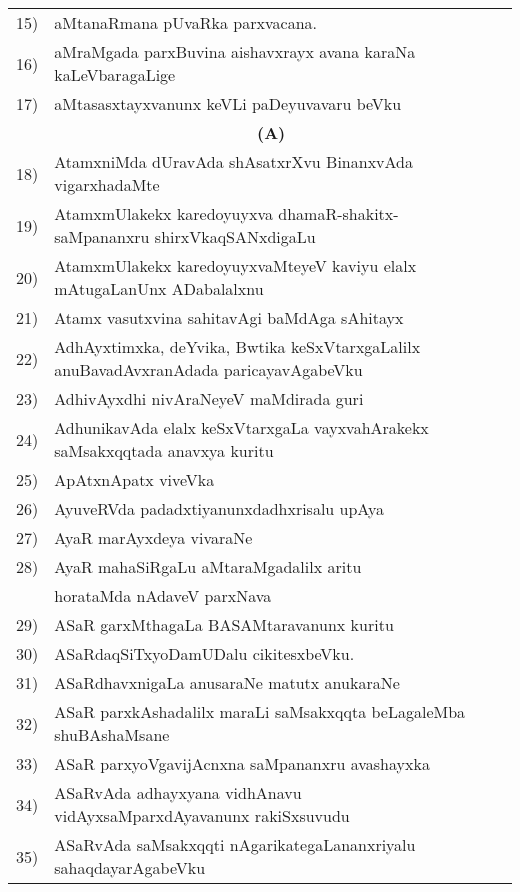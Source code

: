 {\begin{longtable}{@{}cp{7.4cm}r}
15) & aMtanaRmana pUvaRka parxvacana. & \pageref{page83}\\
16) & aMraMgada parxBuvina aishavxrayx avana karaNa kaLeVbaragaLige  & \pageref{page190}\\
17) & aMtasasxtayxvanunx keVLi paDeyuvavaru beVku & \pageref{page108}\\ 
    &   \multicolumn{1}{c}{\textbf{(A)}} & \\    
18) & AtamxniMda dUravAda shAsatxrXvu BinanxvAda vigarxhadaMte &   \pageref{page188}\\
19) & AtamxmUlakekx karedoyuyxva dhamaR-shakitx-saMpananxru shirxVkaqSANxdigaLu &   \pageref{page237}\\
20) & AtamxmUlakekx karedoyuyxvaMteyeV kaviyu elalx mAtugaLanUnx ADabalalxnu &   \pageref{page237}\\
21) & Atamx vasutxvina sahitavAgi baMdAga sAhitayx & \pageref{page196}\\
22) & AdhAyxtimxka, deYvika, Bwtika keSxVtarxgaLalilx anuBavadAvxranAdada paricayavAgabeVku & \pageref{page127}\\
23) & AdhivAyxdhi nivAraNeyeV maMdirada guri & \pageref{page67}\\
24) & AdhunikavAda elalx keSxVtarxgaLa vayxvahArakekx saMsakxqqtada anavxya kuritu & \pageref{page36}\\
25) & ApAtxnApatx viveVka & \pageref{page173}\\
26) & AyuveRVda padadxtiyanunxdadhxrisalu upAya & \pageref{page50}\\
27) & AyaR marAyxdeya vivaraNe & \pageref{page90}\\
28) & AyaR mahaSiRgaLu aMtaraMgadalilx aritu &   \\
    & horataMda nAdaveV parxNava   & \pageref{page138}\\
29) & ASaR garxMthagaLa BASAMtaravanunx kuritu  & \pageref{page32}\\
30) & ASaRdaqSiTxyoDamUDalu cikitesxbeVku. & \pageref{page61}\\
31) & ASaRdhavxnigaLa anusaraNe matutx anukaraNe & \pageref{page120}\\
32) & ASaR parxkAshadalilx maraLi saMsakxqqta beLagaleMba shuBAshaMsane & \pageref{page62}\\
33) & ASaR parxyoVgavijAcnxna saMpananxru avashayxka & \pageref{page54}\\
34) & ASaRvAda adhayxyana vidhAnavu vidAyxsaMparxdAyavanunx rakiSxsuvudu & \pageref{page48}\\
35) & ASaRvAda saMsakxqqti nAgarikategaLananxriyalu sahaqdayarAgabeVku & \pageref{page51}\\

\end{longtable}}
